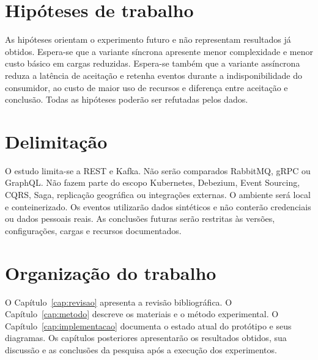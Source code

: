 \section{Hipóteses de trabalho}

As hipóteses orientam o experimento futuro e não representam resultados já obtidos. Espera-se que a variante síncrona apresente menor complexidade e menor custo básico em cargas reduzidas. Espera-se também que a variante assíncrona reduza a latência de aceitação e retenha eventos durante a indisponibilidade do consumidor, ao custo de maior uso de recursos e diferença entre aceitação e conclusão. Todas as hipóteses poderão ser refutadas pelos dados.

\section{Delimitação}

O estudo limita-se a REST e Kafka. Não serão comparados RabbitMQ, gRPC ou GraphQL. Não fazem parte do escopo Kubernetes, Debezium, Event Sourcing, CQRS, Saga, replicação geográfica ou integrações externas. O ambiente será local e conteinerizado. Os eventos utilizarão dados sintéticos e não conterão credenciais ou dados pessoais reais. As conclusões futuras serão restritas às versões, configurações, cargas e recursos documentados.

\section{Organização do trabalho}

O Capítulo~\ref{cap:revisao} apresenta a revisão bibliográfica. O Capítulo~\ref{cap:metodo} descreve os materiais e o método experimental. O Capítulo~\ref{cap:implementacao} documenta o estado atual do protótipo e seus diagramas. Os capítulos posteriores apresentarão os resultados obtidos, sua discussão e as conclusões da pesquisa após a execução dos experimentos.
